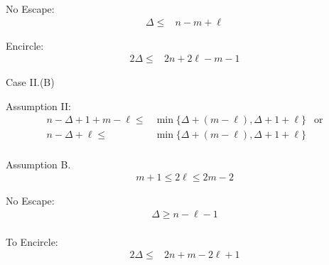 \documentclass[letterpaper, 10pt]{article}
\begin{document}
{\color{blue}
 No Escape:
 \begin{align*}
  \Delta \leq & n - m + \ell
 \end{align*}

 Encircle:
 \begin{align*}
  2 \Delta \leq & 2n + 2\ell - m - 1
 \end{align*} }

{ \color{red} Case II.(B)

 Assumption II:
 \begin{align*}
  n - \Delta +1 + m - \ell \leq &\min \{\Delta + (m - \ell) ,\Delta + 1 + \ell  \} & \text{or} \\
   n - \Delta + \ell \leq &\min \{\Delta + (m - \ell) ,\Delta + 1 + \ell  \} \\
 \end{align*}

 Assumption B.
 \begin{align*}
  m + 1 \leq 2 \ell \leq 2m - 2
 \end{align*} }

{ \color{blue}
 No Escape:
 \begin{align*}
  \Delta \geq n - \ell -1 \\
 \end{align*}

 To Encircle:
 \begin{align*}
  2 \Delta \leq & 2n + m - 2\ell + 1
 \end{align*} }
\end{document}
